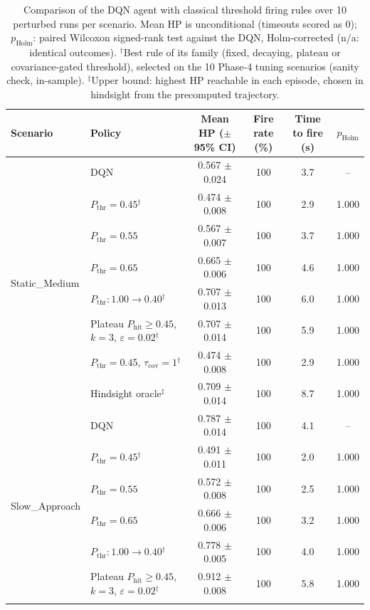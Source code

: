 \begin{table}[htbp]
\centering
\caption{Comparison of the DQN agent with classical threshold firing rules over 10 perturbed runs per scenario. Mean HP is unconditional (timeouts scored as 0); $p_{\mathrm{Holm}}$: paired Wilcoxon signed-rank test against the DQN, Holm-corrected (n/a: identical outcomes). $^{\dagger}$Best rule of its family (fixed, decaying, plateau or covariance-gated threshold), selected on the 10 Phase-4 tuning scenarios (sanity check, in-sample). $^{\ddagger}$Upper bound: highest HP reachable in each episode, chosen in hindsight from the precomputed trajectory.}
\label{tab:comparison-traditional-rl}
\small
\begin{tabular}{llcccc}
\toprule
\textbf{Scenario} & \textbf{Policy} & \textbf{Mean HP ($\pm$95\% CI)} & \textbf{Fire rate (\%)} & \textbf{Time to fire (s)} & $p_{\mathrm{Holm}}$ \\
\midrule
\multirow{8}{*}{Static\_Medium} & DQN & 0.567 $\pm$ 0.024 & 100 & 3.7 & -- \\
 & $P_{\mathrm{thr}}=0.45$$^{\dagger}$ & 0.474 $\pm$ 0.008 & 100 & 2.9 & 1.000 \\
 & $P_{\mathrm{thr}}=0.55$ & 0.567 $\pm$ 0.007 & 100 & 3.7 & 1.000 \\
 & $P_{\mathrm{thr}}=0.65$ & 0.665 $\pm$ 0.006 & 100 & 4.6 & 1.000 \\
 & $P_{\mathrm{thr}}: 1.00 \to 0.40$$^{\dagger}$ & 0.707 $\pm$ 0.013 & 100 & 6.0 & 1.000 \\
 & Plateau $P_{\mathrm{hit}}\geq0.45$, $k=3$, $\varepsilon=0.02$$^{\dagger}$ & 0.707 $\pm$ 0.014 & 100 & 5.9 & 1.000 \\
 & $P_{\mathrm{thr}}=0.45$, $\tau_{\mathrm{cov}}=1$$^{\dagger}$ & 0.474 $\pm$ 0.008 & 100 & 2.9 & 1.000 \\
 & Hindsight oracle$^{\ddagger}$ & 0.709 $\pm$ 0.014 & 100 & 8.7 & 1.000 \\
\midrule
\multirow{8}{*}{Slow\_Approach} & DQN & 0.787 $\pm$ 0.014 & 100 & 4.1 & -- \\
 & $P_{\mathrm{thr}}=0.45$$^{\dagger}$ & 0.491 $\pm$ 0.011 & 100 & 2.0 & 1.000 \\
 & $P_{\mathrm{thr}}=0.55$ & 0.572 $\pm$ 0.008 & 100 & 2.5 & 1.000 \\
 & $P_{\mathrm{thr}}=0.65$ & 0.666 $\pm$ 0.006 & 100 & 3.2 & 1.000 \\
 & $P_{\mathrm{thr}}: 1.00 \to 0.40$$^{\dagger}$ & 0.778 $\pm$ 0.005 & 100 & 4.0 & 1.000 \\
 & Plateau $P_{\mathrm{hit}}\geq0.45$, $k=3$, $\varepsilon=0.02$$^{\dagger}$ & 0.912 $\pm$ 0.008 & 100 & 5.8 & 1.000 \\
$$
\end{tabular}
\end{table}
